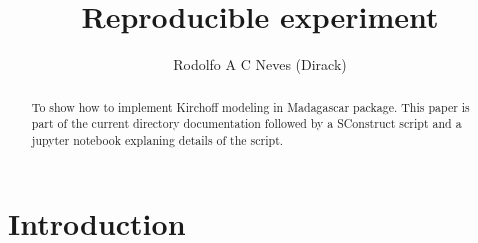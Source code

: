 \title{Reproducible experiment}

\author{Rodolfo A C Neves (Dirack)}
\begin{abstract}
To show how to implement Kirchoff modeling in Madagascar
package. This paper is part of the current directory 
documentation followed by a SConstruct script and a jupyter
notebook explaning details of the script.
\end{abstract}

\section{Introduction}


